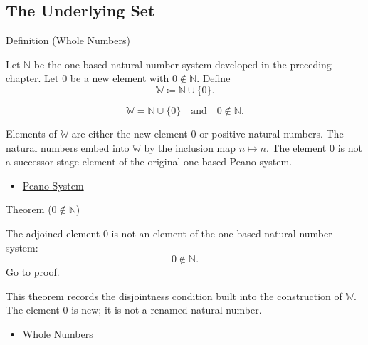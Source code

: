 \subsection*{The Underlying Set}

\begin{definitionbox}{Definition (Whole Numbers)}
\begin{definition}
\label{def:whole-numbers}
Let $\mathbb{N}$ be the one-based natural-number system developed in the
preceding chapter. Let $0$ be a new element with $0\notin\mathbb{N}$. Define
\[
\mathbb{W}\coloneqq \mathbb{N}\cup\{0\}.
\]
\end{definition}
\end{definitionbox}

\begin{remark*}
\[
\mathbb{W}=\mathbb{N}\cup\{0\}
\quad\text{and}\quad
0\notin\mathbb{N}.
\]
\end{remark*}

\begin{remark*}[Interpretation]
Elements of $\mathbb{W}$ are either the new element $0$ or positive natural
numbers. The natural numbers embed into $\mathbb{W}$ by the inclusion map
$n\mapsto n$. The element $0$ is not a successor-stage element of the original
one-based Peano system.
\end{remark*}

\begin{dependencies}
\begin{itemize}
  \item \hyperref[def:peano-system]{Peano System}
\end{itemize}
\end{dependencies}

\begin{theorembox}{Theorem (\texorpdfstring{$0\notin\mathbb{N}$}{0 not in N})}
\begin{theorem}
\label{thm:zero-not-in-n}
The adjoined element $0$ is not an element of the one-based natural-number
system:
\[
0\notin\mathbb{N}.
\]
\hyperref[prf:zero-not-in-n]{Go to proof.}
\end{theorem}
\end{theorembox}

\begin{remark*}[Interpretation]
This theorem records the disjointness condition built into the construction
of $\mathbb{W}$. The element $0$ is new; it is not a renamed natural number.
\end{remark*}

\begin{dependencies}
\begin{itemize}
  \item \hyperref[def:whole-numbers]{Whole Numbers}
\end{itemize}
\end{dependencies}
